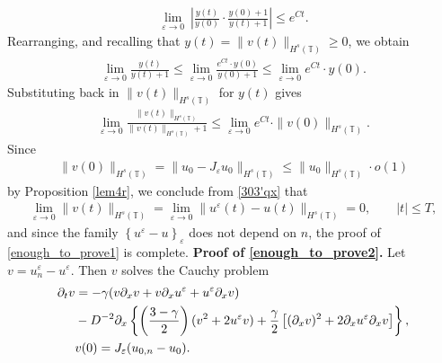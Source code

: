 \documentclass[12pt,reqno]{amsart}
\newcommand{\p}{\partial}
\newcommand{\ci}{\mathbb{T}}
\newcommand{\ee}{\varepsilon}
\theoremstyle{plain}  %
\theoremstyle{definition}
\begin{document}
\begin{appendices}
\begin{equation*}
	\begin{split}
		\lim_{\ee \to 0}  \
		\left | \frac{y(t)}{y(0)} \cdot \frac{y(0) + 1}{y(t) + 1} \right | \le e^{C t}.
	\end{split}
\end{equation*}
Rearranging, and recalling that $y(t) = \|v(t)\|_{H^s(\ci)} \ge 0$, we obtain
\begin{equation*}
	\begin{split}
		\lim_{\ee \to 0} \frac{y(t)}{y(t) + 1}
		\le \lim_{\ee \to 0} \frac{e^{C t} \cdot y(0)}{y(0) + 1} \le
		\lim_{\ee \to 0} e^{C t} \cdot y(0).
	\end{split}
\end{equation*}
Substituting back in $\|v(t)\|_{H^s(\ci)}$ for $y(t)$ gives
\begin{equation}
	\begin{split}
		\lim_{\ee \to 0}	\frac{\|v(t)\|_{H^s(\ci)}}{\|v(t)\|_{H^s(\ci)} + 1}  \le
		\lim_{\ee \to 0} e^{C t} \cdot \|v(0)\|_{H^s(\ci)}.
		\label{303'qx}
	\end{split}
\end{equation}
Since 
\begin{equation*}
	\label{303''qx}
	\begin{split}
		\|v(0)\|_{H^s(\ci)} = \|u_0 - J_\ee u_0 \|_{H^s(\ci)} \le
		\|u_0\|_{H^s(\ci)} \cdot o(1)
	\end{split}
\end{equation*}
by Proposition \ref{lem4r}, we conclude from \eqref{303'qx} that
\begin{equation}
	\label{304qx}
	\begin{split}
		\lim_{\ee \to 0} \|v(t)\|_{H^s(\ci)} = \lim_{\ee \to 0}
		\|u^\ee(t) - u(t)\|_{H^s(\ci)}= 0, \qquad |t| \le T,
	\end{split}
\end{equation}
and since the family $\left\{ u^\ee - u \right\}_\ee$ does not depend on $n$,
the proof of \eqref{enough_to_prove1} is complete. 
\vskip0.1in
%
%
%
%
%
%
%
%
\vskip0.1in
{\bf Proof of \eqref{enough_to_prove2}.} 
Let $v = u^\ee_n - u^\ee$. Then $v$ solves the Cauchy problem
\begin{align}
		\label{4qu}
		\p_t v 
		& =  -\gamma (v \p_x v + v \p_x u^\ee + u^\ee \p_x v)  
		\\
		& - D^{-2} \p_x \left\{ \left (\frac{3-\gamma}{2} \right )(v^2 +
		2u^\ee v) + \frac{\gamma}{2}\left[ (\p_x v)^2 + 2 \p_x u^\ee \p_x v \right]
		\right\}, \notag
		\\
		& v(0) =J_\ee(u_{0,n} - u_0).
		\label{5qu}
	\end{align}

\end{appendices}
\end{document}
